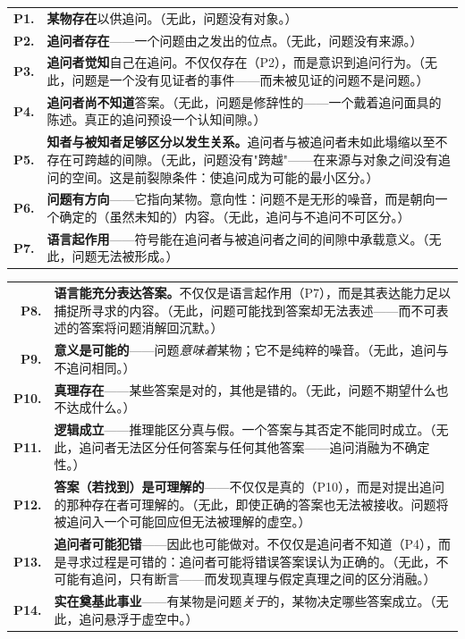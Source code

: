 \documentclass[10pt, openany, oneside]{book}
\renewcommand{\footnotesize}{\fontsize{8.5}{11}\selectfont}
\begin{document}
{\footnotesize
\noindent\begin{tabular}{r p{}}
\textbf{P1.} & \textbf{某物存在}以供追问。（无此，问题没有对象。）\\[0.3em]
\textbf{P2.} & \textbf{追问者存在}——一个问题由之发出的位点。（无此，问题没有来源。）\\[0.3em]
\textbf{P3.} & \textbf{追问者觉知}自己在追问。不仅仅存在（P2），而是意识到追问行为。（无此，问题是一个没有见证者的事件——而未被见证的问题不是问题。）\\[0.3em]
\textbf{P4.} & \textbf{追问者尚不知道}答案。（无此，问题是修辞性的——一个戴着追问面具的陈述。真正的追问预设一个认知间隙。）\\[0.3em]
\textbf{P5.} & \textbf{知者与被知者足够区分以发生关系。}追问者与被追问者未如此塌缩以至不存在可跨越的间隙。（无此，问题没有"跨越"——在来源与对象之间没有追问的空间。这是前裂隙条件：使追问成为可能的最小区分。）\\[0.3em]
\textbf{P6.} & \textbf{问题有方向}——它指向某物。意向性：问题不是无形的噪音，而是朝向一个确定的（虽然未知的）内容。（无此，追问与不追问不可区分。）\\[0.3em]
\textbf{P7.} & \textbf{语言起作用}——符号能在追问者与被追问者之间的间隙中承载意义。（无此，问题无法被形成。）\\[0.3em]
\end{tabular}
}

{\footnotesize
\noindent\begin{tabular}{r p{}}
\textbf{P8.} & \textbf{语言能充分表达答案。}不仅仅是语言起作用（P7），而是其表达能力足以捕捉所寻求的内容。（无此，问题可能找到答案却无法表述——而不可表述的答案将问题消解回沉默。）\\[0.3em]
\textbf{P9.} & \textbf{意义是可能的}——问题\textit{意味着}某物；它不是纯粹的噪音。（无此，追问与不追问相同。）\\[0.3em]
\textbf{P10.} & \textbf{真理存在}——某些答案是对的，其他是错的。（无此，问题不期望什么也不达成什么。）\\[0.3em]
\textbf{P11.} & \textbf{逻辑成立}——推理能区分真与假。一个答案与其否定不能同时成立。（无此，追问者无法区分任何答案与任何其他答案——追问消融为不确定性。）\\[0.3em]
\textbf{P12.} & \textbf{答案（若找到）是可理解的}——不仅仅是真的（P10），而是对提出追问的那种存在者可理解的。（无此，即使正确的答案也无法被接收。问题将被追问入一个可能回应但无法被理解的虚空。）\\[0.3em]
\textbf{P13.} & \textbf{追问者可能犯错}——因此也可能做对。不仅仅是追问者不知道（P4），而是寻求过程是可错的：追问者可能将错误答案误认为正确的。（无此，不可能有追问，只有断言——而发现真理与假定真理之间的区分消融。）\\[0.3em]
\textbf{P14.} & \textbf{实在奠基此事业}——有某物是问题\textit{关于}的，某物决定哪些答案成立。（无此，追问悬浮于虚空中。）\\[0.3em]
\end{tabular}
}
\end{document}
